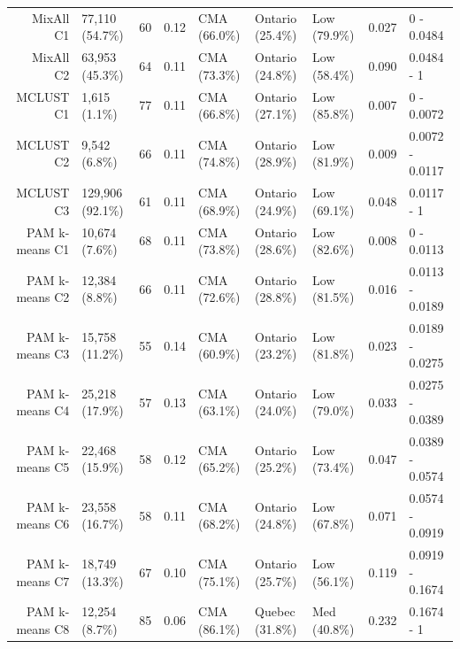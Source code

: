 \documentclass[11pt, a4paper]{article}
\begin{document}
\begin{table}[H]
{\begin{tabular}{|r|llllllll|}
  MixAll C1 & 77,110 (54.7\%) & 60 & 0.12 & CMA (66.0\%) & Ontario (25.4\%) & Low (79.9\%) & 0.027 & 0 - 0.0484 \\
  MixAll C2 & 63,953 (45.3\%) & 64 & 0.11 & CMA (73.3\%) & Ontario (24.8\%) & Low (58.4\%) & 0.090 & 0.0484 - 1 \\
\rowcolor{gray!25}  MCLUST C1 & 1,615 (1.1\%) & 77 & 0.11 & CMA (66.8\%) & Ontario (27.1\%) & Low (85.8\%) & 0.007 & 0 - 0.0072 \\
\rowcolor{gray!25}  MCLUST C2 & 9,542 (6.8\%) & 66 & 0.11 & CMA (74.8\%) & Ontario (28.9\%) & Low (81.9\%) & 0.009 & 0.0072 - 0.0117 \\
 \rowcolor{gray!25} MCLUST C3 & 129,906 (92.1\%) & 61 & 0.11 & CMA (68.9\%) & Ontario (24.9\%) & Low (69.1\%) & 0.048 & 0.0117 - 1 \\
  PAM k-means C1 & 10,674 (7.6\%) & 68 & 0.11 & CMA (73.8\%) & Ontario (28.6\%) & Low (82.6\%) & 0.008 & 0 - 0.0113 \\
  PAM k-means C2 & 12,384 (8.8\%) & 66 & 0.11 & CMA (72.6\%) & Ontario (28.8\%) & Low (81.5\%) & 0.016 & 0.0113 - 0.0189 \\
  PAM k-means C3 & 15,758 (11.2\%) & 55 & 0.14 & CMA (60.9\%) & Ontario (23.2\%) & Low (81.8\%) & 0.023 & 0.0189 - 0.0275 \\
  PAM k-means C4 & 25,218 (17.9\%) & 57 & 0.13 & CMA (63.1\%) & Ontario (24.0\%) & Low (79.0\%) & 0.033 & 0.0275 - 0.0389 \\
  PAM k-means C5 & 22,468 (15.9\%) & 58 & 0.12 & CMA (65.2\%) & Ontario (25.2\%) & Low (73.4\%) & 0.047 & 0.0389 - 0.0574 \\
  PAM k-means C6 & 23,558 (16.7\%) & 58 & 0.11 & CMA (68.2\%) & Ontario (24.8\%) & Low (67.8\%) & 0.071 & 0.0574 - 0.0919 \\
  PAM k-means C7 & 18,749 (13.3\%) & 67 & 0.10 & CMA (75.1\%) & Ontario (25.7\%) & Low (56.1\%) & 0.119 & 0.0919 - 0.1674 \\
  PAM k-means C8 & 12,254 (8.7\%) & 85 & 0.06 & CMA (86.1\%) & Quebec (31.8\%) & Med (40.8\%) & 0.232 & 0.1674 - 1 \\
   \hline
\end{tabular}
}
\end{table}
\end{document}
